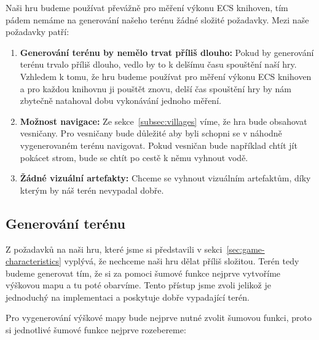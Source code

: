 Naši hru budeme používat převážně pro měření výkonu ECS knihoven, tím pádem nemáme na generování našeho terénu žádné složité požadavky. Mezi naše požadavky patří:

\begin{enumerate}
    \item \textbf{Generování terénu by nemělo trvat příliš dlouho:} Pokud by generování terénu trvalo příliš dlouho, vedlo by to k delšímu času spouštění naší hry. Vzhledem k tomu, že hru budeme používat pro měření výkonu ECS knihoven a pro každou knihovnu ji pouštět znovu, delší čas spouštění hry by nám zbytečně natahoval dobu vykonávání jednoho měření.

    \item \textbf{Možnost navigace:} Ze sekce~\ref{subsec:villages} víme, že hra bude obsahovat vesničany. Pro vesničany bude důležité aby byli schopni se v náhodně vygenerovaném terénu navigovat. Pokud vesničan bude například chtít jít pokácet strom, bude se chtít po cestě k němu vyhnout vodě.

    \item \textbf{Žádné vizuální artefakty:} Chceme se vyhnout vizuálním artefaktům, díky kterým by náš terén nevypadal dobře.
\end{enumerate}

\subsection{Generování terénu}
\label{sec:terrain-gen}
Z požadavků na naši hru, které jsme si představili v sekci~\ref{sec:game-characteristics} vyplývá, že nechceme naši hru dělat příliš složitou. Terén tedy budeme generovat tím, že si za pomoci šumové funkce nejprve vytvoříme výškovou mapu a tu poté obarvíme. Tento přístup jsme zvoli jelikož je jednoduchý na implementaci a poskytuje dobře vypadající terén.

Pro vygenerování výškové mapy bude nejprve nutné zvolit šumovou funkci, proto si jednotlivé šumové funkce nejprve rozebereme:


